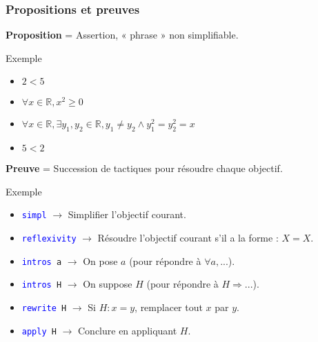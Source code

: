 \documentclass[9pt]{beamer}
\newenvironment{ex}[1][Exemple]{\begin{exampleblock}{#1}}{\end{exampleblock}}
\newcommand{\coq}[1]{\texttt{\textcolor{blue}{#1}}}
\newcommand{\defi}[1]{\textbf{#1}}
\newcommand{\R}{\mathbb{R}}
\begin{document}
\begin{frame}[c]
\frametitle{Propositions et preuves}

\defi{Proposition} = Assertion, « phrase » non simplifiable.
\begin{ex}
\begin{itemize}
  \item $2 < 5$
  \item $\forall x \in \R, x^2 \geq 0$
  \item $\forall x \in \R, \exists y_1, y_2 \in \R, y_1 \not= y_2 \wedge y_1^2 = y_2^2 = x$
  \item $5 < 2$
\end{itemize}
\end{ex}

\bigskip
\defi{Preuve} = Succession de tactiques pour résoudre chaque objectif.
\begin{ex}
\begin{itemize}
  \item \coq{simpl} $\rightarrow$ Simplifier l'objectif courant.
  \item \coq{reflexivity} $\rightarrow$ Résoudre l'objectif courant s'il a la forme : $X = X$.
  \item \coq{intros}\texttt{ a} $\rightarrow$ On pose $a$ (pour répondre à $\forall a, ...$).
  \item \coq{intros}\texttt{ H} $\rightarrow$ On suppose $H$ (pour répondre à $H \Rightarrow ...$).
  \item \coq{rewrite}\texttt{ H} $\rightarrow$ Si $H: x = y$, remplacer tout $x$ par $y$.
  \item \coq{apply}\texttt{ H} $\rightarrow$ Conclure en appliquant $H$.
\end{itemize}
\end{ex}

\end{frame}
\end{document}
